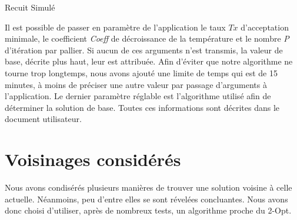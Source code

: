 \documentclass{article}
\begin{document}
\begin{algorithm}[H]
	\SetAlgoLined
	\caption{Recuit Simulé}
\end{algorithm}

Il est possible de passer en paramètre de l'application le taux \emph{$Tx$} d'acceptation minimale,
le coefficient \emph{Coeff} de décroissance de la température et le nombre \emph{P} d'itération par pallier.
Si aucun de ces arguments n'est transmis, la valeur de base, décrite plus haut, leur est attribuée.
Afin d'éviter que notre algorithme ne tourne trop longtemps, nous avons ajouté une limite de temps qui est de 15 minutes, à moins de préciser une autre valeur par passage d'arguments à l'application.
Le dernier paramètre réglable est l'algorithme utilisé afin de déterminer la solution de base.
Toutes ces informations sont décrites dans le document utilisateur.

\section{Voisinages considérés}

Nous avons condisérés plusieurs manières de trouver une solution voisine à celle actuelle. Néanmoins, peu d'entre elles se sont révelées concluantes. Nous avons donc choisi d'utiliser, après de nombreux tests, un algorithme proche du 2-Opt.
\end{document}
